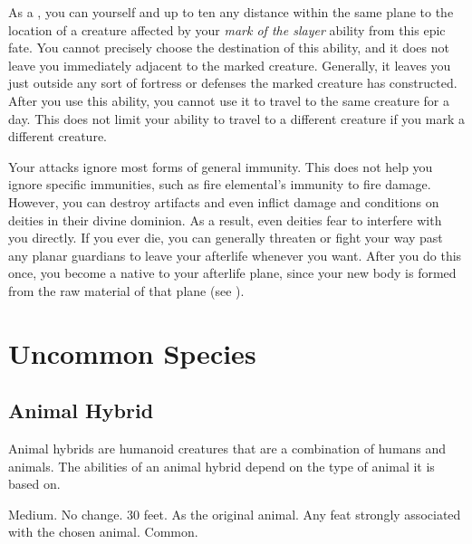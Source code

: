              As a , you can  yourself and up to ten  any distance within the same plane to the location of a creature affected by your \textit{mark of the slayer} ability from this epic fate.
            You cannot precisely choose the destination of this ability, and it does not leave you immediately adjacent to the marked creature.
            Generally, it leaves you just outside any sort of fortress or defenses the marked creature has constructed.
            After you use this ability, you cannot use it to travel to the same creature for a day.
            This does not limit your ability to travel to a different creature if you mark a different creature.

            Your attacks ignore most forms of general immunity.
            This does not help you ignore specific immunities, such as fire elemental's immunity to fire damage.
            However, you can destroy artifacts and even inflict damage and conditions on deities in their divine dominion.
            As a result, even deities fear to interfere with you directly.
            If you ever die, you can generally threaten or fight your way past any planar guardians to leave your afterlife whenever you want.
            After you do this once, you become a  native to your afterlife plane, since your new body is formed from the raw material of that plane (see ).

\section{Uncommon Species}\label{Uncommon Species}

    \subsection{Animal Hybrid}
        Animal hybrids are humanoid creatures that are a combination of humans and animals.
        The abilities of an animal hybrid depend on the type of animal it is based on.

         Medium.
         No change.
         30 feet.
         As the original animal.
         Any feat strongly associated with the chosen animal.
         Common.

